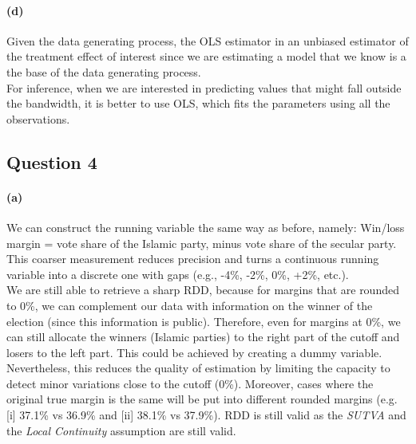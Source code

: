 \documentclass{scrartcl}
\begin{document}




\paragraph*{(d)}
Given the data generating process, the OLS estimator in an unbiased estimator of the treatment effect of interest since we are estimating a model that we know is a the base of the data generating process. \\

For inference, when we are interested in predicting values that might fall outside the bandwidth, it is better to use OLS, which fits the parameters using all the observations.


\subsection*{Question 4} %

\paragraph*{(a)}

We can construct the running variable the same way as before, namely: Win/loss margin = vote share of the Islamic party, minus vote share of the secular party. This coarser measurement reduces precision and turns a continuous running variable into a discrete one with gaps (e.g., -4\%, -2\%, 0\%, +2\%, etc.).  \\

We are still able to retrieve a sharp RDD, because for margins that are rounded to 0\%, we can complement our data with information on the winner of the election (since this information is public). Therefore, even for margins at 0\%, we can still allocate the winners (Islamic parties) to the right part of the cutoff and losers to the left part. This could be achieved by creating a dummy variable. \\

Nevertheless, this reduces the quality of estimation by limiting the capacity to detect minor variations close to the cutoff (0\%). Moreover, cases where the original true margin is the same will be put into different rounded margins (e.g. [i] 37.1\% vs 36.9\% and [ii] 38.1\% vs 37.9\%). RDD is still valid as the \textit{SUTVA} and the \textit{Local Continuity} assumption are still valid.
\end{document}
